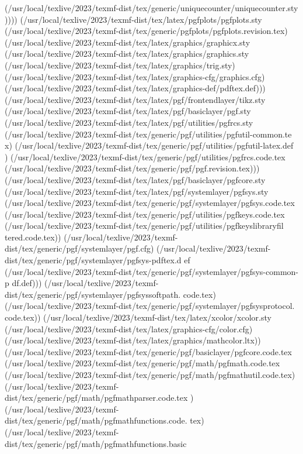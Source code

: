 (/usr/local/texlive/2023/texmf-dist/tex/generic/uniquecounter/uniquecounter.sty
)))) (/usr/local/texlive/2023/texmf-dist/tex/latex/pgfplots/pgfplots.sty
(/usr/local/texlive/2023/texmf-dist/tex/generic/pgfplots/pgfplots.revision.tex)
(/usr/local/texlive/2023/texmf-dist/tex/latex/graphics/graphicx.sty
(/usr/local/texlive/2023/texmf-dist/tex/latex/graphics/graphics.sty
(/usr/local/texlive/2023/texmf-dist/tex/latex/graphics/trig.sty)
(/usr/local/texlive/2023/texmf-dist/tex/latex/graphics-cfg/graphics.cfg)
(/usr/local/texlive/2023/texmf-dist/tex/latex/graphics-def/pdftex.def)))
(/usr/local/texlive/2023/texmf-dist/tex/latex/pgf/frontendlayer/tikz.sty
(/usr/local/texlive/2023/texmf-dist/tex/latex/pgf/basiclayer/pgf.sty
(/usr/local/texlive/2023/texmf-dist/tex/latex/pgf/utilities/pgfrcs.sty
(/usr/local/texlive/2023/texmf-dist/tex/generic/pgf/utilities/pgfutil-common.te
x)
(/usr/local/texlive/2023/texmf-dist/tex/generic/pgf/utilities/pgfutil-latex.def
) (/usr/local/texlive/2023/texmf-dist/tex/generic/pgf/utilities/pgfrcs.code.tex
(/usr/local/texlive/2023/texmf-dist/tex/generic/pgf/pgf.revision.tex)))
(/usr/local/texlive/2023/texmf-dist/tex/latex/pgf/basiclayer/pgfcore.sty
(/usr/local/texlive/2023/texmf-dist/tex/latex/pgf/systemlayer/pgfsys.sty
(/usr/local/texlive/2023/texmf-dist/tex/generic/pgf/systemlayer/pgfsys.code.tex
(/usr/local/texlive/2023/texmf-dist/tex/generic/pgf/utilities/pgfkeys.code.tex
(/usr/local/texlive/2023/texmf-dist/tex/generic/pgf/utilities/pgfkeyslibraryfil
tered.code.tex))
(/usr/local/texlive/2023/texmf-dist/tex/generic/pgf/systemlayer/pgf.cfg)
(/usr/local/texlive/2023/texmf-dist/tex/generic/pgf/systemlayer/pgfsys-pdftex.d
ef
(/usr/local/texlive/2023/texmf-dist/tex/generic/pgf/systemlayer/pgfsys-common-p
df.def)))
(/usr/local/texlive/2023/texmf-dist/tex/generic/pgf/systemlayer/pgfsyssoftpath.
code.tex)
(/usr/local/texlive/2023/texmf-dist/tex/generic/pgf/systemlayer/pgfsysprotocol.
code.tex)) (/usr/local/texlive/2023/texmf-dist/tex/latex/xcolor/xcolor.sty
(/usr/local/texlive/2023/texmf-dist/tex/latex/graphics-cfg/color.cfg)
(/usr/local/texlive/2023/texmf-dist/tex/latex/graphics/mathcolor.ltx))
(/usr/local/texlive/2023/texmf-dist/tex/generic/pgf/basiclayer/pgfcore.code.tex
(/usr/local/texlive/2023/texmf-dist/tex/generic/pgf/math/pgfmath.code.tex
(/usr/local/texlive/2023/texmf-dist/tex/generic/pgf/math/pgfmathutil.code.tex)
(/usr/local/texlive/2023/texmf-dist/tex/generic/pgf/math/pgfmathparser.code.tex
)
(/usr/local/texlive/2023/texmf-dist/tex/generic/pgf/math/pgfmathfunctions.code.
tex)
(/usr/local/texlive/2023/texmf-dist/tex/generic/pgf/math/pgfmathfunctions.basic
